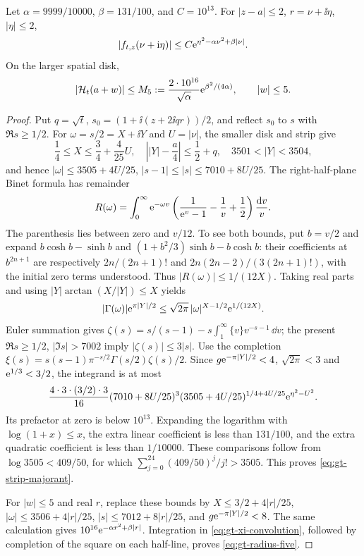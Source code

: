 \begin{lemma}
\label{lem:gt-xi-majorants}
Let \(\alpha=9999/10000\), \(\beta=131/100\), and \(C=10^{13}\).
For \(|z-a|\le2\), \(r=\nu+\ii\eta\), \(|\eta|\le2\),
\begin{equation}
 |f_{t,z}(\nu+\mathrm i\eta)|
 \le C\mathrm e^{\eta^2-\alpha\nu^2+\beta|\nu|}.
 \label{eq:gt-strip-majorant}
\end{equation}
On the larger spatial disk,
\begin{equation}
 |\mathcal H_t(a+w)|\le
 M_5:=\frac{2\cdot10^{16}}{\sqrt\alpha}
             \mathrm e^{\beta^2/(4\alpha)},\qquad |w|\le5 .
 \label{eq:gt-radius-five}
\end{equation}
\end{lemma}
\begin{proof}
Put \(q=\sqrt t\), \(s_0=(1+\ii(z+2\ii qr))/2\), and reflect \(s_0\)
to \(s\) with \(\Re s\ge1/2\). For \(\omega=s/2=X+\ii Y\) and
\(U=|\nu|\), the smaller disk and strip give
\[
 \frac14\le X\le\frac34+\frac4{25}U,\quad
 \left||Y|-\frac a4\right|\le\frac12+q,\quad
 3501<|Y|<3504,
\]
and hence \(|\omega|\le3505+4U/25\),
\(|s-1|\le|s|\le7010+8U/25\).
The right-half-plane Binet formula \cite[Eq.~5.9.10\_2]{dlmf} has remainder
\[
 R(\omega)=\int_0^\infty \mathrm e^{-\omega v}
       \left(\frac1{\mathrm e^v-1}-\frac1v+\frac12\right)\frac{\mathrm d v}{v}.
\]
The parenthesis lies between zero and \(v/12\). To see both bounds,
put \(b=v/2\) and expand \(b\cosh b-\sinh b\) and
\((1+b^2/3)\sinh b-b\cosh b\): their coefficients at
\(b^{2n+1}\) are respectively \(2n/(2n+1)!\) and
\(2n(2n-2)/(3(2n+1)!)\), with the initial zero terms understood.
Thus \(|R(\omega)|\le1/(12X)\). Taking real parts and using
\(|Y|\arctan(X/|Y|)\le X\) yields
\[
 |\Gamma(\omega)|\mathrm e^{\pi|Y|/2}
 \le\sqrt{2\pi}\,|\omega|^{X-1/2}\mathrm e^{1/(12X)}.
\]
Euler summation gives
\(\zeta(s)=s/(s-1)-s\int_1^\infty\{v\}v^{-s-1}\,\dd v\);
the present \(\Re s\ge1/2\), \(|\Im s|>7002\) imply
\(|\zeta(s)|\le3|s|\). Use the completion
\(\xi(s)=s(s-1)\pi^{-s/2}\Gamma(s/2)\zeta(s)/2\).
Since \(g\mathrm e^{-\pi|Y|/2}<4\), \(\sqrt{2\pi}<3\) and
\(\mathrm e^{1/3}<3/2\), the integrand is at most
\[
 \frac{4\cdot3\cdot(3/2)\cdot3}{16}
 (7010+8U/25)^3(3505+4U/25)^{1/4+4U/25}\mathrm e^{\eta^2-U^2}.
\]
Its prefactor at zero is below \(10^{13}\).
Expanding the logarithm with \(\log(1+x)\le x\), the extra linear
coefficient is less than \(131/100\), and the extra quadratic
coefficient is less than \(1/10000\).
These comparisons follow from
\(\log3505<409/50\), for which
\(\sum_{j=0}^{24}(409/50)^j/j!>3505\).
This proves \eqref{eq:gt-strip-majorant}.

For \(|w|\le5\) and real \(r\), replace these bounds by
\(X\le3/2+4|r|/25\), \(|\omega|\le3506+4|r|/25\),
\(|s|\le7012+8|r|/25\), and
\(g\mathrm e^{-\pi|Y|/2}<8\).
The same calculation gives
\(10^{16}\mathrm e^{-\alpha r^2+\beta|r|}\).
Integration in \eqref{eq:gt-xi-convolution}, followed by completion
of the square on each half-line, proves \eqref{eq:gt-radius-five}.
\end{proof}


